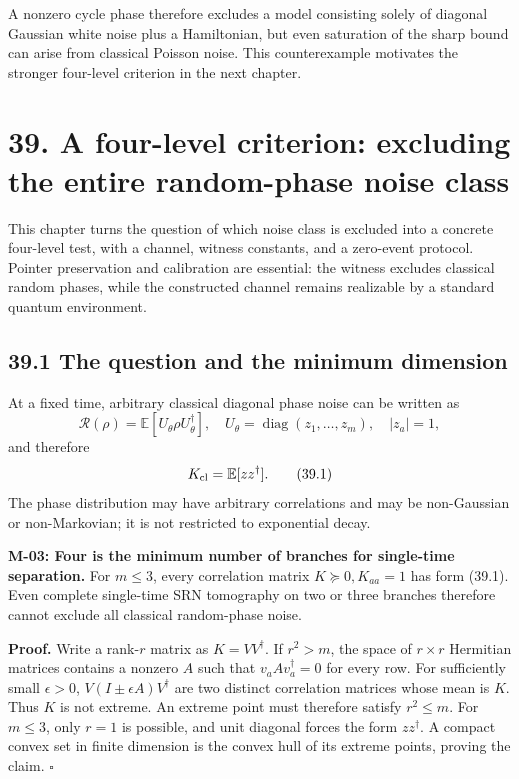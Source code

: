 \documentclass[
  11pt,
  oneside]{book}
\begin{document}
A nonzero cycle phase therefore excludes a model consisting solely of
diagonal Gaussian white noise plus a Hamiltonian, but even saturation of
the sharp bound can arise from classical Poisson noise. This
counterexample motivates the stronger four-level criterion in the next
chapter.

\chapter{39. A four-level criterion: excluding the entire random-phase
noise class}\label{ch-39}

This chapter turns the question of which noise class is excluded into a
concrete four-level test, with a channel, witness constants, and a
zero-event protocol. Pointer preservation and calibration are essential:
the witness excludes classical random phases, while the constructed
channel remains realizable by a standard quantum environment.

\section{39.1 The question and the minimum dimension}

At a fixed time, arbitrary classical diagonal phase noise can be written
as \[
\mathcal R(\rho)=\mathbb E[U_\theta\rho U_\theta^\dagger],
\quad U_\theta=\operatorname{diag}(z_1,\ldots,z_m),\quad |z_a|=1,
\] and therefore \[
K_{\rm cl}=\mathbb E[zz^\dagger].
\tag{39.1}
\] The phase distribution may have arbitrary correlations and may be
non-Gaussian or non-Markovian; it is not restricted to exponential
decay.

\label{m-03}{}

\textbf{M-03: Four is the minimum number of branches for single-time
separation.} For \(m\le3\), every correlation matrix
\(K\succeq0,K_{aa}=1\) has form (39.1). Even complete single-time SRN
tomography on two or three branches therefore cannot exclude all
classical random-phase noise.

\textbf{Proof.} Write a rank-\(r\) matrix as \(K=VV^\dagger\). If
\(r^2>m\), the space of \(r\times r\) Hermitian matrices contains a
nonzero \(A\) such that \(v_aAv_a^\dagger=0\) for every row. For
sufficiently small \(\epsilon>0\), \(V(I\pm\epsilon A)V^\dagger\) are
two distinct correlation matrices whose mean is \(K\). Thus \(K\) is not
extreme. An extreme point must therefore satisfy \(r^2\le m\). For
\(m\le3\), only \(r=1\) is possible, and unit diagonal forces the form
\(zz^\dagger\). A compact convex set in finite dimension is the convex
hull of its extreme points, proving the claim. \(\square\)
\end{document}

